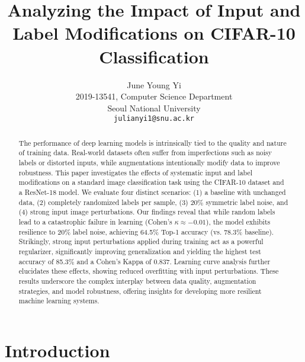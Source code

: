 \documentclass[10pt,twocolumn,letterpaper]{article}
\begin{document}
\title{Analyzing the Impact of Input and Label Modifications on CIFAR-10 Classification}

\author{June Young Yi\\ %
2019-13541, Computer Science Department\\
Seoul National University\\ %
{\tt\small julianyi1@snu.ac.kr} %
}

\maketitle

\begin{abstract}
    The performance of deep learning models is intrinsically tied to the quality and nature of training data. Real-world datasets often suffer from imperfections such as noisy labels or distorted inputs, while augmentations intentionally modify data to improve robustness. This paper investigates the effects of systematic input and label modifications on a standard image classification task using the CIFAR-10 dataset and a ResNet-18 model. We evaluate four distinct scenarios: (1) a baseline with unchanged data, (2) completely randomized labels per sample, (3) 20\% symmetric label noise, and (4) strong input image perturbations. Our findings reveal that while random labels lead to a catastrophic failure in learning (Cohen's $\kappa \approx -0.01$), the model exhibits resilience to 20\% label noise, achieving 64.5\% Top-1 accuracy (vs. 78.3\% baseline). Strikingly, strong input perturbations applied during training act as a powerful regularizer, significantly improving generalization and yielding the highest test accuracy of 85.3\% and a Cohen's Kappa of 0.837. Learning curve analysis further elucidates these effects, showing reduced overfitting with input perturbations. These results underscore the complex interplay between data quality, augmentation strategies, and model robustness, offering insights for developing more resilient machine learning systems.
\end{abstract}

\section{Introduction}
\label{sec:intro}
\end{document}
